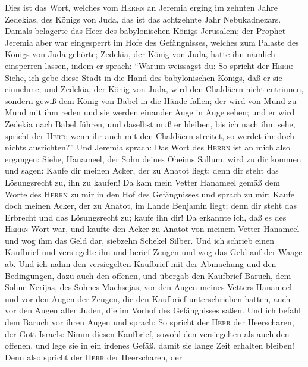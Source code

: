  Dies ist das Wort, welches vom \textsc{Herrn} an Jeremia
erging im zehnten Jahre Zedekias, des Königs von Juda, das ist das
achtzehnte Jahr Nebukadnezars.  Damals belagerte das Heer
des babylonischen Königs Jerusalem; der Prophet Jeremia aber war
eingesperrt im Hofe des Gefängnisses, welches zum Palaste des Königs von
Juda gehörte;  Zedekia, der König von Juda, hatte ihn
nämlich einsperren lassen, indem er sprach: ``Warum weissagst du: So
spricht der \textsc{Herr}: Siehe, ich gebe diese Stadt in die Hand des
babylonischen Königs, daß er sie einnehme;  und Zedekia,
der König von Juda, wird den Chaldäern nicht entrinnen, sondern gewiß
dem König von Babel in die Hände fallen; der wird von Mund zu Mund mit
ihm reden und sie werden einander Auge in Auge sehen;  und
er wird Zedekia nach Babel führen, und daselbst muß er bleiben, bis ich
nach ihm sehe, spricht der \textsc{Herr}; wenn ihr auch mit den
Chaldäern streitet, so werdet ihr doch nichts ausrichten?''
 Und Jeremia sprach: Das Wort des \textsc{Herrn} ist an
mich also ergangen:  Siehe, Hanameel, der Sohn deines
Oheims Sallum, wird zu dir kommen und sagen: Kaufe dir meinen Acker, der
zu Anatot liegt; denn dir steht das Lösungsrecht zu, ihn zu kaufen!
 Da kam mein Vetter Hanameel gemäß dem Worte des
\textsc{Herrn} zu mir in den Hof des Gefängnisses und sprach zu mir:
Kaufe doch meinen Acker, der zu Anatot, im Lande Benjamin liegt; denn
dir steht das Erbrecht und das Lösungsrecht zu; kaufe ihn dir!
 Da erkannte ich, daß es des \textsc{Herrn} Wort war, und
kaufte den Acker zu Anatot von meinem Vetter Hanameel und wog ihm das
Geld dar, siebzehn Schekel Silber.  Und ich schrieb einen
Kaufbrief und versiegelte ihn und berief Zeugen und wog das Geld auf der
Waage ab.  Und ich nahm den versiegelten Kaufbrief mit
der Abmachung und den Bedingungen, dazu auch den offenen,
 und übergab den Kaufbrief Baruch, dem Sohne Nerijas, des
Sohnes Machsejas, vor den Augen meines Vetters Hanameel und vor den
Augen der Zeugen, die den Kaufbrief unterschrieben hatten, auch vor den
Augen aller Juden, die im Vorhof des Gefängnisses saßen. 
Und ich befahl dem Baruch vor ihren Augen und sprach:  So
spricht der \textsc{Herr} der Heerscharen, der Gott Israels: Nimm diesen
Kaufbrief, sowohl den versiegelten als auch den offenen, und lege sie in
ein irdenes Gefäß, damit sie lange Zeit erhalten bleiben!
 Denn also spricht der \textsc{Herr} der Heerscharen, der
